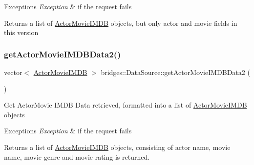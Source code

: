 \begin{DoxyExceptions}{Exceptions}
{\em Exception} & if the request fails\\
\hline
\end{DoxyExceptions}
\begin{DoxyReturn}{Returns}
a list of \mbox{\hyperlink{classbridges_1_1_actor_movie_i_m_d_b}{Actor\+Movie\+I\+M\+DB}} objects, but only actor and movie fields in this version 
\end{DoxyReturn}
\mbox{\label{namespacebridges_1_1_data_source_a022113cbb28042171d088250e85098d0}} 
\subsubsection{\texorpdfstring{get\+Actor\+Movie\+I\+M\+D\+B\+Data2()}{getActorMovieIMDBData2()}}
{\footnotesize\ttfamily vector$<$ \mbox{\hyperlink{classbridges_1_1_actor_movie_i_m_d_b}{Actor\+Movie\+I\+M\+DB}} $>$ bridges\+::\+Data\+Source\+::get\+Actor\+Movie\+I\+M\+D\+B\+Data2 (\begin{DoxyParamCaption}{ }\end{DoxyParamCaption})}

Get Actor\+Movie I\+M\+DB Data retrieved, formatted into a list of \mbox{\hyperlink{classbridges_1_1_actor_movie_i_m_d_b}{Actor\+Movie\+I\+M\+DB}} objects


\begin{DoxyExceptions}{Exceptions}
{\em Exception} & if the request fails\\
\hline
\end{DoxyExceptions}
\begin{DoxyReturn}{Returns}
a list of \mbox{\hyperlink{classbridges_1_1_actor_movie_i_m_d_b}{Actor\+Movie\+I\+M\+DB}} objects, consisting of actor name, movie name, movie genre and movie rating is returned. 
\end{DoxyReturn}
\mbox{\label{namespacebridges_1_1_data_source_a4f8990ea0e793a6464d95cb82f57c8f9}} 
